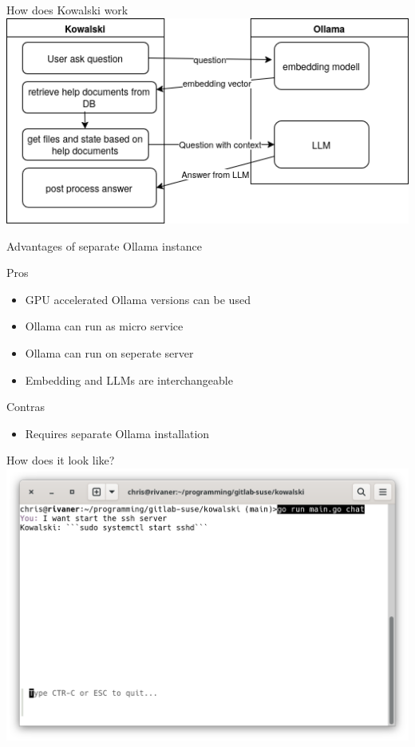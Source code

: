 \documentclass[aspectratio=169]{beamer}
\begin{document}
\begin{frame}{How does Kowalski work}
\includegraphics[width=\linewidth]{Flow.drawio}
\end{frame}

\begin{frame}{Advantages of separate Ollama instance}
\begin{block}{Pros}
\begin{itemize}
  \item GPU accelerated Ollama versions can be used
  \item Ollama can run as micro service
  \item Ollama can run on seperate server
  \item Embedding and LLMs are interchangeable
\end{itemize}
\end{block}
\begin{block}{Contras}
\begin{itemize}
  \item Requires separate Ollama installation
\end{itemize}
\end{block}
\end{frame}

\begin{frame}{How does it look like?}
\includegraphics[width=.8\linewidth]{Startsshd.png}
\end{frame}
\end{document}
